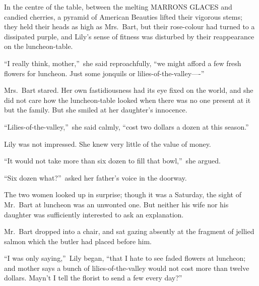 \documentclass[12pt,a4paper]{book}
\begin{document}
In the centre of the table, between the melting MARRONS GLACES
and candied cherries, a pyramid of American Beauties lifted their
vigorous stems; they held their heads as high as Mrs.\ Bart, but
their rose-colour had turned to a dissipated purple, and Lily's
sense of fitness was disturbed by their reappearance on the
luncheon-table.





``I really think, mother,''\ she said reproachfully, ``we might
afford a few fresh flowers for luncheon. Just some jonquils or
lilies-of-the-valley----''





Mrs.\ Bart stared. Her own fastidiousness had its eye fixed on the
world, and she did not care how the luncheon-table looked
when there was no one present at it but the family. But she
smiled at her daughter's innocence.





``Lilies-of-the-valley,''\ she said calmly, ``cost two dollars a
dozen at this season.''





Lily was not impressed. She knew very little of the value of
money.





``It would not take more than six dozen to fill that bowl,''\ she
argued.





``Six dozen what?''\ asked her father's voice in the doorway.





The two women looked up in surprise; though it was a Saturday,
the sight of Mr.\ Bart at luncheon was an unwonted one. But
neither his wife nor his daughter was sufficiently interested to
ask an explanation.





Mr.\ Bart dropped into a chair, and sat gazing absently at the
fragment of jellied salmon which the butler had placed before
him.





``I was only saying,''\ Lily began, ``that I hate to see faded
flowers at luncheon; and mother says a bunch of lilies-of-the-valley would not cost more than twelve dollars. Mayn't I tell the
florist to send a few every day?''
\end{document}
